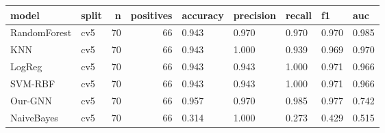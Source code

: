 \begin{tabular}{llrrlllll}
\toprule
model & split & n & positives & accuracy & precision & recall & f1 & auc \\
\midrule
RandomForest & cv5 & 70 & 66 & 0.943 & 0.970 & 0.970 & 0.970 & 0.985 \\
KNN & cv5 & 70 & 66 & 0.943 & 1.000 & 0.939 & 0.969 & 0.970 \\
LogReg & cv5 & 70 & 66 & 0.943 & 0.943 & 1.000 & 0.971 & 0.966 \\
SVM-RBF & cv5 & 70 & 66 & 0.943 & 0.943 & 1.000 & 0.971 & 0.966 \\
Our-GNN & cv5 & 70 & 66 & 0.957 & 0.970 & 0.985 & 0.977 & 0.742 \\
NaiveBayes & cv5 & 70 & 66 & 0.314 & 1.000 & 0.273 & 0.429 & 0.515 \\
\bottomrule
\end{tabular}
